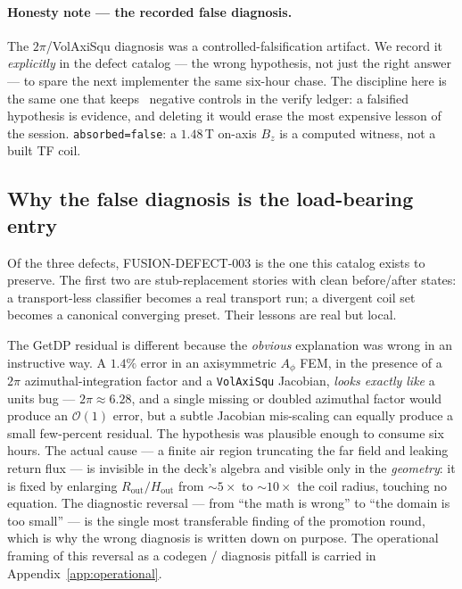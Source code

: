 \paragraph{Honesty note --- the recorded false diagnosis.}
The $2\pi$/VolAxiSqu diagnosis was a controlled-falsification artifact.
We record it \emph{explicitly} in the defect catalog --- the wrong
hypothesis, not just the right answer --- to spare the next implementer
the same six-hour chase. The discipline here is the same one that keeps
\tierRed\ negative controls in the verify ledger: a falsified hypothesis
is evidence, and deleting it would erase the most expensive lesson of the
session. \texttt{absorbed=false}: a $1.48$\,T on-axis $B_z$ is a computed
witness, not a built TF coil.

\subsection{Why the false diagnosis is the load-bearing entry}
\label{app:adapters:loadbearing}

Of the three defects, FUSION-DEFECT-003 is the one this catalog exists to
preserve. The first two are stub-replacement stories with clean
before/after states: a transport-less classifier becomes a real
transport run; a divergent coil set becomes a canonical converging
preset. Their lessons are real but local.

The GetDP residual is different because the \emph{obvious} explanation
was wrong in an instructive way. A $1.4\%$ error in an axisymmetric
$A_\phi$ FEM, in the presence of a $2\pi$ azimuthal-integration factor
and a \texttt{VolAxiSqu} Jacobian, \emph{looks exactly like} a units bug
--- $2\pi \approx 6.28$, and a single missing or doubled azimuthal
factor would produce an $\mathcal{O}(1)$ error, but a subtle Jacobian
mis-scaling can equally produce a small few-percent residual. The
hypothesis was plausible enough to consume six hours. The actual cause
--- a finite air region truncating the far field and leaking return flux
--- is invisible in the deck's algebra and visible only in the
\emph{geometry}: it is fixed by enlarging $R_{\text{out}}/H_{\text{out}}$
from $\sim5\times$ to $\sim10\times$ the coil radius, touching no
equation. The diagnostic reversal --- from ``the math is wrong'' to
``the domain is too small'' --- is the single most transferable finding
of the promotion round, which is why the wrong diagnosis is written down
on purpose. The operational framing of this reversal as a codegen /
diagnosis pitfall is carried in Appendix~\ref{app:operational}.

